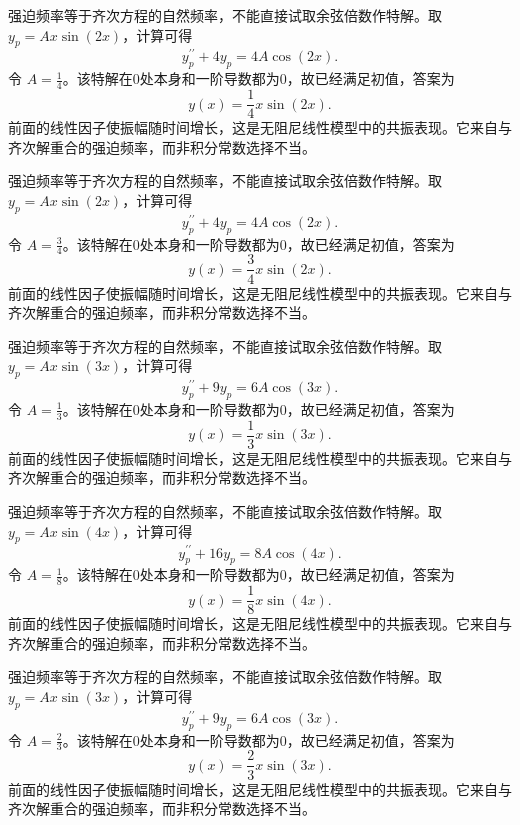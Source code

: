 \documentclass[UTF8,12pt,a4paper,fontset=fandol]{ctexart}
\begin{document}
\begin{solve}\label{ans:c23q20}
强迫频率等于齐次方程的自然频率，不能直接试取余弦倍数作特解。取 $y_p=A x\sin(2x)$，计算可得
\[
y_p^{\prime\prime}+4y_p=4A\cos(2x).
\]
令 $A=\frac{1}{4}$。该特解在0处本身和一阶导数都为0，故已经满足初值，答案为
\[
y(x)=\frac{1}{4}x\sin(2x).
\]
前面的线性因子使振幅随时间增长，这是无阻尼线性模型中的共振表现。它来自与齐次解重合的强迫频率，而非积分常数选择不当。
\end{solve}

\begin{solve}\label{ans:c23q21}
强迫频率等于齐次方程的自然频率，不能直接试取余弦倍数作特解。取 $y_p=A x\sin(2x)$，计算可得
\[
y_p^{\prime\prime}+4y_p=4A\cos(2x).
\]
令 $A=\frac{3}{4}$。该特解在0处本身和一阶导数都为0，故已经满足初值，答案为
\[
y(x)=\frac{3}{4}x\sin(2x).
\]
前面的线性因子使振幅随时间增长，这是无阻尼线性模型中的共振表现。它来自与齐次解重合的强迫频率，而非积分常数选择不当。
\end{solve}

\begin{solve}\label{ans:c23q22}
强迫频率等于齐次方程的自然频率，不能直接试取余弦倍数作特解。取 $y_p=A x\sin(3x)$，计算可得
\[
y_p^{\prime\prime}+9y_p=6A\cos(3x).
\]
令 $A=\frac{1}{3}$。该特解在0处本身和一阶导数都为0，故已经满足初值，答案为
\[
y(x)=\frac{1}{3}x\sin(3x).
\]
前面的线性因子使振幅随时间增长，这是无阻尼线性模型中的共振表现。它来自与齐次解重合的强迫频率，而非积分常数选择不当。
\end{solve}

\begin{solve}\label{ans:c23q23}
强迫频率等于齐次方程的自然频率，不能直接试取余弦倍数作特解。取 $y_p=A x\sin(4x)$，计算可得
\[
y_p^{\prime\prime}+16y_p=8A\cos(4x).
\]
令 $A=\frac{1}{8}$。该特解在0处本身和一阶导数都为0，故已经满足初值，答案为
\[
y(x)=\frac{1}{8}x\sin(4x).
\]
前面的线性因子使振幅随时间增长，这是无阻尼线性模型中的共振表现。它来自与齐次解重合的强迫频率，而非积分常数选择不当。
\end{solve}

\begin{solve}\label{ans:c23q24}
强迫频率等于齐次方程的自然频率，不能直接试取余弦倍数作特解。取 $y_p=A x\sin(3x)$，计算可得
\[
y_p^{\prime\prime}+9y_p=6A\cos(3x).
\]
令 $A=\frac{2}{3}$。该特解在0处本身和一阶导数都为0，故已经满足初值，答案为
\[
y(x)=\frac{2}{3}x\sin(3x).
\]
前面的线性因子使振幅随时间增长，这是无阻尼线性模型中的共振表现。它来自与齐次解重合的强迫频率，而非积分常数选择不当。
\end{solve}
\end{document}
